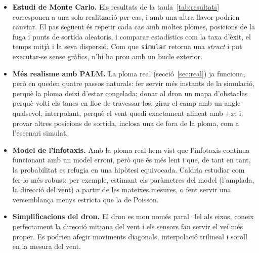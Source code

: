 \documentclass[11pt,a4paper]{article}
\begin{document}
\begin{itemize}
\item \textbf{Estudi de Monte Carlo.} Els resultats de la taula~\ref{tab:resultats} corresponen a una sola realització per cas, i amb una altra llavor podrien canviar. El pas següent és repetir cada cas amb moltes plomes, posicions de la fuga i punts de sortida aleatoris, i comparar estadístics com la taxa d'èxit, el temps mitjà i la seva dispersió. Com que \texttt{simular} retorna una \emph{struct} i pot executar-se sense gràfics, n'hi ha prou amb un bucle exterior.
\item \textbf{Més realisme amb PALM.} La ploma real (secció~\ref{sec:real}) ja funciona, però en queden quatre passos naturals: fer servir més instants de la simulació, perquè la ploma deixi d'estar congelada; donar al dron un mapa d'obstacles perquè volti els tancs en lloc de travessar-los; girar el camp amb un angle qualsevol, interpolant, perquè el vent quedi exactament alineat amb $+x$; i provar altres posicions de sortida, inclosa una de fora de la ploma, com a l'escenari simulat.
\item \textbf{Model de l'infotaxis.} Amb la ploma real hem vist que l'infotaxis continua funcionant amb un model erroni, però que és més lent i que, de tant en tant, la probabilitat es refugia en una hipòtesi equivocada. Caldria estudiar com fer-lo més robust: per exemple, estimant els paràmetres del model (l'amplada, la direcció del vent) a partir de les mateixes mesures, o fent servir una versemblança menys estricta que la de Poisson.
\item \textbf{Simplificacions del dron.} El dron es mou només paral·lel als eixos, coneix perfectament la direcció mitjana del vent i els sensors fan servir el veí més proper. Es podrien afegir moviments diagonals, interpolació trilineal i soroll en la mesura del vent.
\end{itemize}
\end{document}
